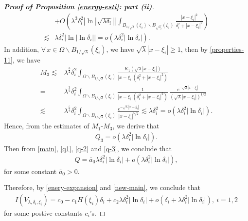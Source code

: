 \documentclass[a4paper,reqno,11pt,oneside]{amsart}
\numberwithin{equation}{section}
\begin{document}
\begin{proof}[\textbf{Proof of Proposition \eqref{energy-esti}: part (ii)}]
\begin{align*}
    &+O\left(\lambda^3\delta_i^2\left|\ln|\sqrt{\lambda\delta_i}|\right|\displaystyle\int_{B_{1/\sqrt{\lambda}}(\xi_i)\backslash B_{\sqrt{\delta_i}}(\xi_i)}\frac{|x-\xi_i|^2}{\delta_i^2+|x-\xi_i|^2}\right)
    \\\lesssim&\lambda\delta_i^{2}\left|\ln|\ln{\delta_i}|\right|=o\left(\lambda\delta_i^2|\ln{\delta_i}|\right).
\end{align*}
In addition, $\forall\,x\in\Omega\backslash B_{1/\sqrt{\lambda}}(\xi_i)$, we have $\sqrt{\lambda}|x-\xi_i|\geq 1$, then by \eqref{properties-11}, we have
\begin{align*}
    M_{3}\lesssim&\lambda^{\frac{3}{2}}\delta_i^2\displaystyle\int_{\Omega\backslash B_{1/\sqrt{\lambda}}(\xi_i)}\frac{ K_{1}(\sqrt{\lambda}|x-\xi_i|)}{|x-\xi_i|\left(\delta_i^2+|x-\xi_i|^2\right)}\\
    =&\lambda^{\frac{3}{2}}\delta_i^2\displaystyle\int_{\Omega\backslash B_{1/\sqrt{\lambda}}(\xi_i)}\frac{1}{|x-\xi_i|\left(\delta_i^2+|x-\xi_i|^2\right)}\,\frac{ e^{-\sqrt{\lambda}|x-\xi_i|}}{\left(\sqrt{\lambda}|x-\xi_i|\right)^{1/2}}\\
    \lesssim&\lambda^{\frac{5}{4}}\delta_i^2\displaystyle\int_{\Omega\backslash B_{1/\sqrt{\lambda}}(\xi_i)}\frac{e^{-\sqrt{\lambda}|x-\xi_i|}}{|x-\xi_i|^{7/2}}\lesssim\lambda\delta_i^2=o\left(\lambda\delta_i^2|\ln{\delta_i}|\right).
\end{align*}
Hence, from the estimates of $M_1$-$M_3$, we derive that
\begin{align}\label{q-3}
    Q_{3}=o\left(\lambda\delta_i^2|\ln{\delta_i}|\right).
\end{align}
Then from \eqref{main}, \eqref{q1}, \eqref{q-2} and \eqref{q-3}, we conclude that
\begin{align}
    \label{new-main}
   Q= {\bar{a}_0} \lambda\delta_i^2|\ln{\delta_i}|+o\left(\lambda\delta_i^2|\ln{\delta_i}|\right),
\end{align}
for some constant $\bar{a}_0>0$.

Therefore, by \eqref{enery-expansion} and \eqref{new-main}, we conclude that
\begin{align}\label{newnew-ef}
    I\left(V_{\lambda,\delta_i,\xi_i}\right)=c_0-c_1H(\xi_i)\delta_i+c_2\lambda\delta_i^2|\ln{\delta_i}|+o\left(\delta_i+\lambda\delta_i^2|\ln{\delta_i}|\right),\ i=1,2
\end{align}
for some postive constants $c_i$'s.


\end{proof}
\end{document}
